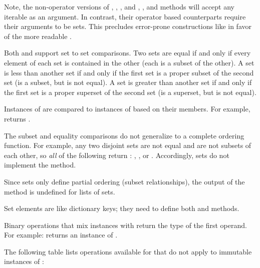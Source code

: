 Note, the non-operator versions of , ,
, and ,
, and  methods will accept any
iterable as an argument.  In contrast, their operator based counterparts
require their arguments to be sets.  This precludes error-prone constructions
like  in favor of the more readable
.

Both  and  support set to set comparisons.
Two sets are equal if and only if every element of each set is contained in
the other (each is a subset of the other).
A set is less than another set if and only if the first set is a proper
subset of the second set (is a subset, but is not equal).
A set is greater than another set if and only if the first set is a proper
superset of the second set (is a superset, but is not equal).

Instances of  are compared to instances of  based
on their members.  For example,  returns
.     

The subset and equality comparisons do not generalize to a complete
ordering function.  For example, any two disjoint sets are not equal and
are not subsets of each other, so \emph{all} of the following return
:  , , or
.
Accordingly, sets do not implement the  method.

Since sets only define partial ordering (subset relationships), the output
of the  method is undefined for lists of sets.

Set elements are like dictionary keys; they need to define both
 and  methods.

Binary operations that mix  instances with 
return the type of the first operand.  For example:
 returns an instance of .

The following table lists operations available for 
that do not apply to immutable instances of :

